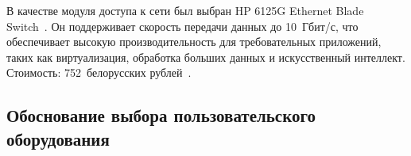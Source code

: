 
        
        

        




В качестве модуля доступа к сети был выбран HP 6125G Ethernet Blade Switch~\cite{hp-blade-switch}. Он поддерживает скорость передачи данных до 10~Гбит/с, что обеспечивает высокую производительность для требовательных приложений, таких как виртуализация, обработка больших данных и искусственный интеллект. Стоимость: 752~белорусских рублей~\cite{hp-blade-switch}.

\subsection{Обоснование выбора пользовательского оборудования}


